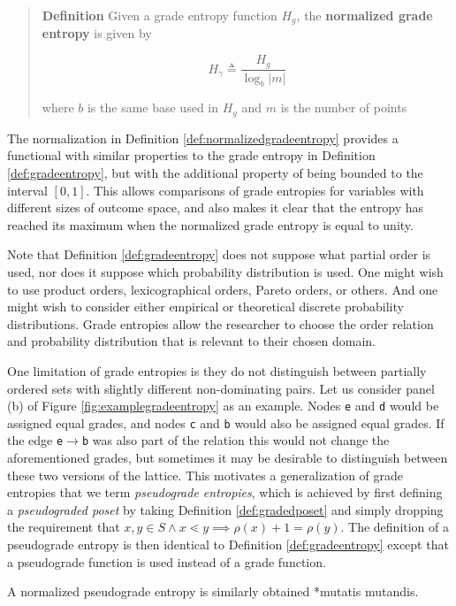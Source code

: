 \documentclass[
  letterpaper,
  DIV=11,
  numbers=noendperiod]{scrreprt}
\begin{document}
\begin{quote}
\textbf{Definition} Given a grade entropy function \(H_g\), the
\textbf{normalized grade entropy} is given by

\[H_{\gamma} \triangleq \frac{H_g}{\log_b |m|}\]

where \(b\) is the same base used in \(H_g\) and \(m\) is the number of
points
\end{quote}

The normalization in Definition \ref{def:normalizedgradeentropy}
provides a functional with similar properties to the grade entropy in
Definition \ref{def:gradeentropy}, but with the additional property of
being bounded to the interval \([0,1]\). This allows comparisons of
grade entropies for variables with different sizes of outcome space, and
also makes it clear that the entropy has reached its maximum when the
normalized grade entropy is equal to unity.

Note that Definition \ref{def:gradeentropy} does not suppose what
partial order is used, nor does it suppose which probability
distribution is used. One might wish to use product orders,
lexicographical orders, Pareto orders, or others. And one might wish to
consider either empirical or theoretical discrete probability
distributions. Grade entropies allow the researcher to choose the order
relation and probability distribution that is relevant to their chosen
domain.

One limitation of grade entropies is they do not distinguish between
partially ordered sets with slightly different non-dominating pairs. Let
us consider panel (b) of Figure \ref{fig:examplegradeentropy} as an
example. Nodes \texttt{e} and \texttt{d} would be assigned equal grades,
and nodes \texttt{c} and \texttt{b} would also be assigned equal grades.
If the edge \texttt{e}\(\rightarrow\)\texttt{b} was also part of the
relation this would not change the aforementioned grades, but sometimes
it may be desirable to distinguish between these two versions of the
lattice. This motivates a generalization of grade entropies that we term
\textit{pseudograde entropies}, which is achieved by first defining a
\emph{pseudograded poset} by taking Definition \ref{def:gradedposet} and
simply dropping the requirement that
\(x,y \in S \land x \lessdot y \implies \rho(x) + 1 = \rho(y)\). The
definition of a pseudograde entropy is then identical to Definition
\ref{def:gradeentropy} except that a pseudograde function is used
instead of a grade function.

\begin{tcolorbox}[enhanced jigsaw, colframe=quarto-callout-note-color-frame, toptitle=1mm, bottomtitle=1mm, breakable, colbacktitle=quarto-callout-note-color!10!white, arc=.35mm, coltitle=black, opacitybacktitle=0.6, opacityback=0, leftrule=.75mm, titlerule=0mm, title=\textcolor{quarto-callout-note-color}{\faInfo}\hspace{0.5em}{Note}, rightrule=.15mm, toprule=.15mm, colback=white, bottomrule=.15mm, left=2mm]

A normalized pseudograde entropy is similarly obtained *mutatis
mutandis.

\end{tcolorbox}
\end{document}
